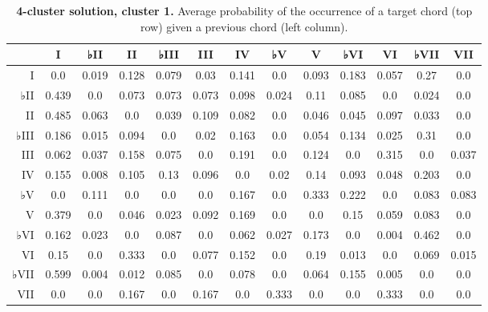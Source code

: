 \begin{table}[htbp]
\begin{minipage}{\linewidth}
\setlength{\tymax}{0.5\linewidth}
\centering
\small
\caption{\textbf{4-cluster solution, cluster 1.} Average probability of the occurrence of a target chord (top row) given a previous chord (left column).}
\label{4-clustersolutioncluster1.averageprobabilityoftheoccurrenceofatargetchordtoprowgivenapreviouschordleftcolumn.}
\begin{tabulary}{\textwidth}{@{}RCCCCCCCCCCCC@{}} \toprule
&I&♭II&II&♭III&III&IV&♭V&V&♭VI&VI&♭VII&VII\\
\midrule
I&0.0&0.019&0.128&0.079&0.03&0.141&0.0&0.093&0.183&0.057&0.27&0.0\\
♭II&0.439&0.0&0.073&0.073&0.073&0.098&0.024&0.11&0.085&0.0&0.024&0.0\\
II&0.485&0.063&0.0&0.039&0.109&0.082&0.0&0.046&0.045&0.097&0.033&0.0\\
♭III&0.186&0.015&0.094&0.0&0.02&0.163&0.0&0.054&0.134&0.025&0.31&0.0\\
III&0.062&0.037&0.158&0.075&0.0&0.191&0.0&0.124&0.0&0.315&0.0&0.037\\
IV&0.155&0.008&0.105&0.13&0.096&0.0&0.02&0.14&0.093&0.048&0.203&0.0\\
♭V&0.0&0.111&0.0&0.0&0.0&0.167&0.0&0.333&0.222&0.0&0.083&0.083\\
V&0.379&0.0&0.046&0.023&0.092&0.169&0.0&0.0&0.15&0.059&0.083&0.0\\
♭VI&0.162&0.023&0.0&0.087&0.0&0.062&0.027&0.173&0.0&0.004&0.462&0.0\\
VI&0.15&0.0&0.333&0.0&0.077&0.152&0.0&0.19&0.013&0.0&0.069&0.015\\
♭VII&0.599&0.004&0.012&0.085&0.0&0.078&0.0&0.064&0.155&0.005&0.0&0.0\\
VII&0.0&0.0&0.167&0.0&0.167&0.0&0.333&0.0&0.0&0.333&0.0&0.0\\

\bottomrule

\end{tabulary}
\end{minipage}
\end{table}

